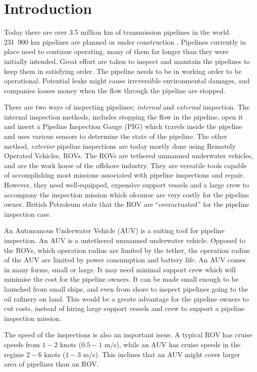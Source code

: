 \chapter{Introduction}
	Today there are over 3.5 million km of transmission pipelines in the world. 231~900 km pipelines
	are planned or under construction \cite{DNV_pipelines}. Pipelines currently in place need to
	continue operating, many of them far longer than they were initially intended. Great effort are taken
	to inspect and maintain the pipelines to keep them in satisfying order.  The pipeline needs to be 
	in working order to be operational.
	Potential leaks might cause irreversible environmental damages, and companies looses money when the
	flow through the pipeline are stopped. 

	There are two ways of inspecting pipelines; \textit{internal} and \textit{external} 
	inspection. The internal inspection methods, includes stopping the flow in the pipeline,
	open it and insert a Pipeline Inspection Gauge (PIG) which travels inside the pipeline and uses various
	sensors to determine the state of the pipeline. The other method, \textit{exterior} pipeline
	inspections are today mostly done using Remotely Operated Vehicles, ROVs. The ROVs are tethered
	unmanned underwater vehicles, and are the work horse of the offshore industry. They are versatile
	tools capable of accomplishing most missions associated with pipeline inspections and repair. However,
	they need well-equipped, expensive support vessels and a large crew to accompany the inspection
	mission which ofcourse are very costly for the pipeline owner. British Petroleum stats that the ROV
	are ``overactuated'' for the pipeline inspection case.\cite{pipelines}

	An Autonomous Underwater Vehicle (AUV) is a suiting tool for pipeline inspection. An AUV is a
	untethered unmanned underwater vehicle. Opposed to the ROVs, which operation radius are limited by the
	tether, the operation radius of the AUV are limited by power consumption and battery life. 
	An AUV comes in many forms, small or large. It may need minimal support crew which will minimise the
	cost for the pipeline owners. It can be made small enough to be launched from small ships, and even
	from shore to inspect pipelines going to the oil rafinery on land. This would be a greate advantage
	for the pipeline owners to cut costs, instead of hiring large support vessels and crew to support a
	pipeline inspection mission.
	
	The speed of the inspections is also an important issue. A typical ROV has cruise speeds from $1-2$
	knots ($0.5-1$ m/s), while an AUV has cruise speeds in the regime $2-6$ knots ($1-3$ m/s). This
	inclines that an AUV might cover larger area of pipelines than an ROV. 

